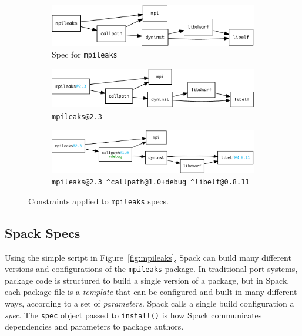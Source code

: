 
\begin{figure}
	\begin{subfigure}{\linewidth}
		\centering
		\includegraphics[width=\columnwidth]{specs/mpileaks.pdf}
		\caption{
			Spec for {\tt mpileaks}
			\label{fig:specs-mpileaks}
		}
	\end{subfigure}
%
	\begin{subfigure}{\linewidth}
		\centering
		\includegraphics[width=\columnwidth]{specs/mpileaks-version}
		\caption{
			{\tt mpileaks@2.3}
			\label{fig:specs-mpileaks-version}
		}
	\end{subfigure}
%
	\begin{subfigure}{\linewidth}
		\centering
		\includegraphics[width=\columnwidth]{specs/mpileaks-abstract.pdf}
		\caption{
			{\tt mpileaks@2.3 \^{}callpath@1.0+debug \^{}libelf@0.8.11}
			\label{fig:specs-mpileaks-abstract}
		}
	\end{subfigure}
%
	\caption{
		Constraints applied to {\tt mpileaks} specs.
	}
	\label{fig:specs}
\end{figure}



\subsection{Spack Specs}\label{sec:specs}

Using the simple script in Figure~\ref{fig:mpileaks}, Spack can build many different
versions and configurations of the {\tt mpileaks} package.  In traditional port systems,
package code is structured to build a single version of a package, but in Spack, each
package file is a {\it template} that can be configured and built in many
different ways, according to a set of {\it parameters}.
Spack calls a single build configuration a {\it spec}. The {\tt spec} object
passed to {\tt install()} is how Spack communicates dependencies and parameters to package authors.

